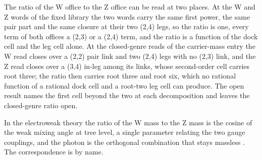 The ratio of the W office to the Z office can be read at two places. At the W and Z words of the fixed library the two words carry the same first power, the same pair part and the same closure at their two (2,4) legs, so the ratio is one, every term of both offices a (2,3) or a (2,4) term, and the ratio is a function of the dock cell and the leg cell alone. At the closed-genre reads of the carrier-mass entry the W read closes over a (2,2) pair link and two (2,4) legs with no (2,3) link, and the Z read closes over a (3,4) in-leg among its links, whose second-order cell carries root three; the ratio then carries root three and root six, which no rational function of a rational dock cell and a root-two leg cell can produce. The open result names the first cell beyond the two at each decomposition and leaves the closed-genre ratio open.
\begin{chbridge}
In the electroweak theory the ratio of the W mass to the Z mass is the cosine of the weak mixing angle at tree level, a single parameter relating the two gauge couplings, and the photon is the orthogonal combination that stays massless \cite{Weinberg1967,Peskin1995}. The correspondence is by name.
\end{chbridge}

